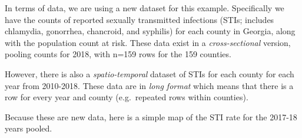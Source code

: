 \documentclass[
]{book}
\newenvironment{Shaded}{\begin{snugshade}}{\end{snugshade}}
\newcommand{\CommentTok}[1]{\textcolor[rgb]{0.56,0.35,0.01}{\textit{#1}}}
\newcommand{\FunctionTok}[1]{\textcolor[rgb]{0.00,0.00,0.00}{#1}}
\newcommand{\NormalTok}[1]{#1}
\newcommand{\OtherTok}[1]{\textcolor[rgb]{0.56,0.35,0.01}{#1}}
\newcommand{\SpecialCharTok}[1]{\textcolor[rgb]{0.00,0.00,0.00}{#1}}
\newcommand{\StringTok}[1]{\textcolor[rgb]{0.31,0.60,0.02}{#1}}
\begin{document}
In terms of data, we are using a new dataset for this example. Specifically we have the counts of reported sexually transmitted infections (STIs; includes chlamydia, gonorrhea, chancroid, and syphilis) for each county in Georgia, along with the population count at risk. These data exist in a \emph{cross-sectional} version, pooling counts for 2018, with n=159 rows for the 159 counties.

However, there is also a \emph{spatio-temporal} dataset of STIs for each county for each year from 2010-2018. These data are in \emph{long format} which means that there is a row for every year and county (e.g.~repeated rows within counties).

\begin{Shaded}
\end{Shaded}

Because these are new data, here is a simple map of the STI rate for the 2017-18 years pooled.
\end{document}
